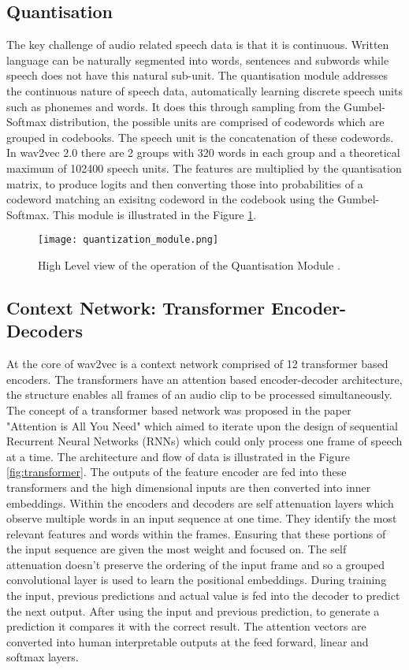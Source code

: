 \subsection{Quantisation}
The key challenge of audio related speech data is that it is continuous. Written language can be naturally segmented into words, sentences and subwords while speech does not have 
this natural sub-unit. The quantisation module addresses the continuous nature of speech data, automatically learning discrete speech units such as phonemes and words. It does this through 
sampling from the Gumbel-Softmax distribution, the possible units are comprised of codewords which are grouped in codebooks. The speech unit is the concatenation of these codewords. 
In wav2vec 2.0 there are 2 groups with 320 words in each group and a theoretical maximum of 102400 speech units. The features are multiplied by the quantisation matrix, 
to produce logits and then converting those into probabilities of a codeword matching an exisitng codeword in the codebook using the  Gumbel-Softmax. This module is illustrated in the Figure 
\ref{fig:quantisation}. 

\begin{figure}[h!]
    \centering
    \texttt{[image: quantization\_module.png]}
    \caption{High Level view of the operation of the Quantisation Module \cite{jonathan_bgn_wav2vec2_2021}.}
    \label{fig:quantisation}
\end{figure}


\subsection{Context Network: Transformer Encoder-Decoders}
At the core of wav2vec is a context network comprised of 12 transformer based encoders. The transformers have an attention based 
encoder-decoder architecture, the structure enables all frames of an audio clip to be processed simultaneously. The concept of a transformer based 
network was proposed in the paper "Attention is All You Need" \cite{vaswani_attention_2017} which aimed to iterate upon the design of sequential Recurrent Neural Networks (RNNs) which could 
only process one frame of speech at a time. The architecture and flow of data is illustrated in the Figure \ref{fig:transformer}. 
The outputs of the feature encoder are fed into these transformers and the high dimensional inputs are then converted into inner embeddings. 
Within the encoders and decoders are self attenuation layers which observe multiple words in an input sequence at one time. They identify the most relevant features and words within the frames. Ensuring that these 
portions of the input sequence are given the most weight and focused on. The self attenuation doesn't preserve the ordering of the 
input frame and so a grouped convolutional layer is used to learn the positional embeddings. During training the input, previous predictions and actual value is fed into the decoder to predict the next output. 
After using the input and previous prediction, to generate a prediction it compares it with the correct result. The attention vectors are converted into human interpretable outputs at the feed forward, linear and softmax layers. 


